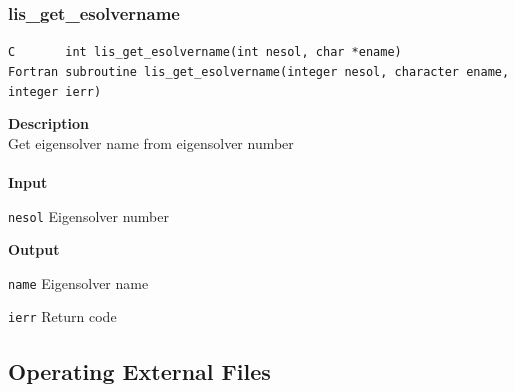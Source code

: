 \documentclass[a4paper]{article}
\newcommand{\namelistlabel}[1]{\mbox{#1}\hfill}
\newenvironment{namelist}[1]{%
 \begin{list}{}
  {\let\makelabel\namelistlabel
  \settowidth{\labelwidth}{#1}
  \setlength{\leftmargin}{1.1\labelwidth}}
}{%
\end{list}}
\begin{document}
  \subsubsection{lis\_get\_esolvername}
\begin{screen}
\verb|C       int lis_get_esolvername(int nesol, char *ename)|\\
\verb|Fortran subroutine lis_get_esolvername(integer nesol, character ename, integer ierr)|
\end{screen}
{\bf Description}\\
\indent
Get eigensolver name from eigensolver number
\\ \\
\noindent
{\bf Input}
\begin{namelist}{XXXXXXXXXXXXXXXXXXXX}
\item[\tt nesol] Eigensolver number
\end{namelist}
{\bf Output}
\begin{namelist}{XXXXXXXXXXXXXXXXXXXX}
\item[\tt name] Eigensolver name
\item[\tt ierr] Return code
\end{namelist}

\newpage
\subsection{Operating External Files}
\end{document}
